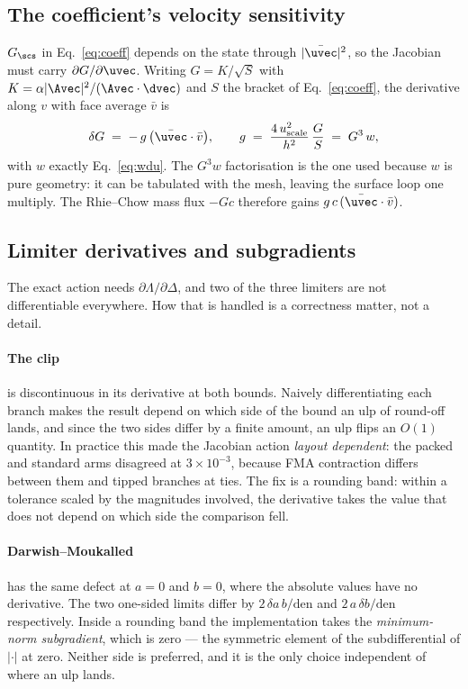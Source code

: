 \subsection{The coefficient's velocity sensitivity}

$G_\scs$ in Eq.~\eqref{eq:coeff} depends on the state through $|\bar{\uvec}|^2$, so the Jacobian
must carry $\partial G/\partial\uvec$. Writing $G = K/\sqrt{S}$ with
$K = \alpha|\Avec|^2/(\Avec\cdot\dvec)$ and $S$ the bracket of Eq.~\eqref{eq:coeff}, the
derivative along $v$ with face average $\bar{v}$ is
\begin{equation}
\delta G \;=\; -\,g\,\bigl(\bar{\uvec}\cdot\bar{v}\bigr),
\qquad
g \;=\; \frac{4\,u^2_{\text{scale}}}{h^2}\,\frac{G}{S} \;=\; G^3\,w ,
\end{equation}
with $w$ exactly Eq.~\eqref{eq:wdu}. The $G^3 w$ factorisation is the one used because $w$ is pure
geometry: it can be tabulated with the mesh, leaving the surface loop one multiply. The
Rhie--Chow mass flux $-G c$ therefore gains $g\,c\,(\bar{\uvec}\cdot\bar{v})$.

\subsection{Limiter derivatives and subgradients}
\label{sec:jac:subgrad}

The exact action needs $\partial\Lambda/\partial\Delta$, and two of the three limiters are not
differentiable everywhere. How that is handled is a correctness matter, not a detail.

\paragraph{The clip} is discontinuous in its derivative at both bounds. Naively differentiating
each branch makes the result depend on which side of the bound an ulp of round-off lands, and
since the two sides differ by a finite amount, an ulp flips an $O(1)$ quantity. In practice this
made the Jacobian action \emph{layout dependent}: the packed and standard arms disagreed at
$3\times10^{-3}$, because FMA contraction differs between them and tipped branches at ties. The
fix is a rounding band: within a tolerance scaled by the magnitudes involved, the derivative takes
the value that does not depend on which side the comparison fell.

\paragraph{Darwish--Moukalled} has the same defect at $a=0$ and $b=0$, where the absolute values
have no derivative. The two one-sided limits differ by $2\,\delta a\,b/\mathrm{den}$ and
$2\,a\,\delta b/\mathrm{den}$ respectively. Inside a rounding band the implementation takes the
\emph{minimum-norm subgradient}, which is zero --- the symmetric element of the subdifferential of
$|\cdot|$ at zero. Neither side is preferred, and it is the only choice independent of where an
ulp lands.

